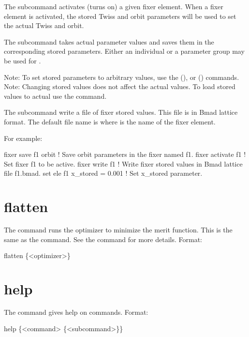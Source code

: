 The  subcommand activates (turns on) a given fixer element. When a fixer element is
activated, the stored Twiss and orbit parameters will be used to set the actual Twiss and orbit.

The  subcommand takes actual parameter values and saves them in the corresponding
stored parameters. Either an individual or a parameter group may be used for .

Note: To set stored parameters to arbitrary values, use the  (),
or  () commands. Note: Changing stored values does not affect
the actual values. To load stored values to actual use the  command.

The  subcommand write a file of fixer stored values. This file is in Bmad lattice
format. The default file name is  where  is the name of the fixer
element.

For example:
\begin{example}
  fixer save f1 orbit    ! Save orbit parameters in the fixer named f1.
  fixer activate f1      ! Set fixer f1 to be active.
  fixer write f1         ! Write fixer stored values in Bmad lattice file f1.bmad.
  set ele f1 x_stored = 0.001  ! Set x_stored parameter.
\end{example}

\section{flatten}
\label{s:flatten}

The  command runs the optimizer to minimize the merit function. This is the same as the
 command.  See the  command for more details. Format:
\begin{example}
  flatten \{<optimizer>\}
\end{example}

\vskip 10pt

\section{help}
\label{s:help}

The  command gives help on \tao commands. Format:
\begin{example}
  help \{<command> \{<subcommand>\}\}
\end{example}

